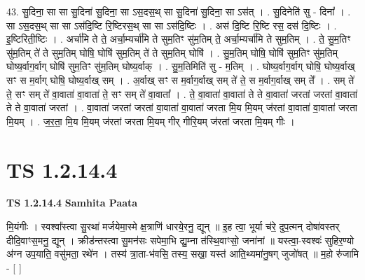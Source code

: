 \documentclass[17pt]{extarticle}
\begin{document}
43. सु॒दिना॒ सा सा सु॒दिना॑ सु॒दिना॒ सा ऽस॒दस॒थ् सा सु॒दिना॑ सु॒दिना॒ सा ऽस॑त् । . सु॒दिनेति॑ सु - दिना᳚ । . सा ऽस॒दस॒थ् सा सा ऽस॑दि॒ष्टि रि॒ष्टिरस॒थ् सा सा ऽस॑दि॒ष्टिः । . अस॑ दि॒ष्टि रि॒ष्टि रस॒ दस॑ दि॒ष्टिः । . इ॒ष्टिरिती॒ष्टिः । . अर्चा॑मि ते ते॒ अर्चा॒म्यर्चा॑मि ते सुम॒तिꣳ सु॑म॒तिम् ते॒ अर्चा॒म्यर्चा॑मि ते सुम॒तिम् । . ते॒ सु॒म॒तिꣳ सु॑म॒तिम् ते॑ ते सुम॒तिम् घोषि॒ घोषि॑ सुम॒तिम् ते॑ ते सुम॒तिम् घोषि॑ । . सु॒म॒तिम् घोषि॒ घोषि॑ सुम॒तिꣳ सु॑म॒तिम् घोष्य॒र्वाग॒र्वाग् घोषि॑ सुम॒तिꣳ सु॑म॒तिम् घोष्य॒र्वाक् । . सु॒म॒तिमिति॑ सु - म॒तिम् । . घोष्य॒र्वाग॒र्वाग् घोषि॒ घोष्य॒र्वाख् सꣳ स म॒र्वाग् घोषि॒ घोष्य॒र्वाख् सम् । . अ॒र्वाख् सꣳ स म॒र्वाग॒र्वाख् सम् ते॑ ते॒ स म॒र्वाग॒र्वाख् सम् ते᳚ । . सम् ते॑ ते॒ सꣳ सम् ते॑ वा॒वाता॑ वा॒वाता॑ ते॒ सꣳ सम् ते॑ वा॒वाता᳚ । . ते॒ वा॒वाता॑ वा॒वाता॑ ते ते वा॒वाता॑ जरतां जरतां वा॒वाता॑ ते ते वा॒वाता॑ जरतां । . वा॒वाता॑ जरतां जरतां वा॒वाता॑ वा॒वाता॑ जरता मि॒य मि॒यम् ज॑रतां वा॒वाता॑ वा॒वाता॑ जरता मि॒यम् । . ज॒र॒ता॒ मि॒य मि॒यम् ज॑रतां जरता मि॒यम् गीर् गीरि॒यम् ज॑रतां जरता मि॒यम् गीः । \newline
\pagebreak
{}

\section{ TS 1.2.14.4 }

\textbf{TS 1.2.14.4 } \newline
\textbf{Samhita Paata} \newline

मि॒यंगीः । स्वश्वा᳚स्त्वा सु॒रथा॑ मर्जयेमा॒स्मे क्ष॒त्राणि॑ धारये॒रनु॒ द्यून् ॥ इ॒ह त्वा॒ भूर्या च॑रे॒ दुप॒त्मन् दोषा॑वस्तर् दीदि॒वाꣳस॒मनु॒ द्यून् । क्रीड॑न्तस्त्वा सु॒मन॑सः सपेमा॒भि द्यु॒म्ना त॑स्थि॒वाꣳसो॒ जना॑नां ॥ यस्त्वा॒-स्वश्वः॑ सुहिर॒ण्यो अ॑ग्न उप॒याति॒ वसु॑मता॒ रथे॑न । तस्य॑ त्रा॒ता-भ॑वसि॒ तस्य॒ सखा॒ यस्त॑ आति॒थ्यमा॑नु॒षग् जुजो॑षत् ॥ म॒हो रु॑जामि - [ ] \newline
\end{document}
